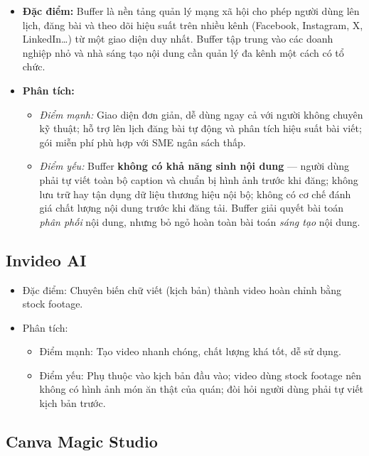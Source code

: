 \begin{itemize}
\item
  \textbf{Đặc điểm:} Buffer là nền tảng quản lý mạng xã hội cho phép
  người dùng lên lịch, đăng bài và theo dõi hiệu suất trên nhiều kênh
  (Facebook, Instagram, X, LinkedIn\ldots) từ một giao diện duy nhất.
  Buffer tập trung vào các doanh nghiệp nhỏ và nhà sáng tạo nội dung
  cần quản lý đa kênh một cách có tổ chức.
\item
  \textbf{Phân tích:}

  \begin{itemize}
  \item
    \textit{Điểm mạnh:} Giao diện đơn giản, dễ dùng ngay cả với người
    không chuyên kỹ thuật; hỗ trợ lên lịch đăng bài tự động và phân
    tích hiệu suất bài viết; gói miễn phí phù hợp với SME ngân sách
    thấp.
  \item
    \textit{Điểm yếu:} Buffer \textbf{không có khả năng sinh nội dung}
    --- người dùng phải tự viết toàn bộ caption và chuẩn bị hình ảnh
    trước khi đăng; không lưu trữ hay tận dụng dữ liệu thương hiệu nội
    bộ; không có cơ chế đánh giá chất lượng nội dung trước khi đăng
    tải. Buffer giải quyết bài toán \emph{phân phối} nội dung, nhưng
    bỏ ngỏ hoàn toàn bài toán \emph{sáng tạo} nội dung.
  \end{itemize}
\end{itemize}

\subsection{Invideo AI}\label{subsec:invideo}

\begin{itemize}
\item
  Đặc điểm: Chuyên biến chữ viết (kịch bản) thành video hoàn chỉnh bằng
  stock footage.
\item
  Phân tích:

  \begin{itemize}
  \item
    Điểm mạnh: Tạo video nhanh chóng, chất lượng khá tốt, dễ sử dụng.
  \item
    Điểm yếu: Phụ thuộc vào kịch bản đầu vào; video dùng stock footage
    nên không có hình ảnh món ăn thật của quán; đòi hỏi người dùng phải
    tự viết kịch bản trước.
  \end{itemize}
\end{itemize}

\subsection{Canva Magic Studio}\label{subsec:canva}

